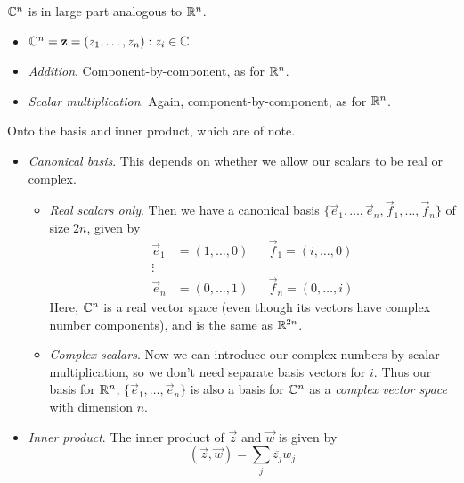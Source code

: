 \documentclass{../../template/note}
\begin{document}
    \begin{definition}
        \(\mathbb C^n\) is in large part analogous to \(\mathbb R^n\).
        \begin{itemize}
            \item \(\CC^n = {\vec z = (z_1, \dots, z_n): z_i \in \CC}\)
            \item \emph{Addition}. Component-by-component, as for \(\mathbb R^n\).
            \item \emph{Scalar multiplication}. Again, component-by-component, as for \(\mathbb R^n\).
        \end{itemize}
        Onto the basis and inner product, which are of note.
        \begin{itemize}
            \item \emph{Canonical basis}. This depends on whether we allow our scalars to be real or complex.
            \begin{itemize}
                \item \emph{Real scalars only}. Then we have a canonical basis \(\{\vec e_1, \dots, \vec e_n, \vec f_1, \dots, \vec f_n\}\) of size \(2n\), given by
                \begin{align*}
                    \vec e_1 &= (1, \dots, 0) && \vec f_1 = (i, \dots, 0) \\
                    \vdots \\
                    \vec e_n &= (0, \dots, 1) && \vec f_n = (0, \dots, i)
                \end{align*}
                Here, \(\mathbb C^n\) is a real vector space (even though its vectors have complex number components), and is the same as \(\mathbb R^{2n}\).
                \item \emph{Complex scalars}. Now we can introduce our complex numbers by scalar multiplication, so we don't need separate basis vectors for \(i\). Thus our basis for \(\mathbb R^n\), \(\{\vec e_1, \dots, \vec e_n\}\) is also a basis for \(\mathbb C^n\) as a \emph{complex vector space} with dimension \(n\).
            \end{itemize}
            \item \emph{Inner product}. The inner product of \(\vec z\) and \(\vec w\) is given by
            \[
                (\vec z, \vec w)= \sum_j \overline{z_j} w_j
            \]
        \end{itemize}
            \begin{itemize}[resume]       
        

\end{itemize}
\end{definition}
\end{document}
